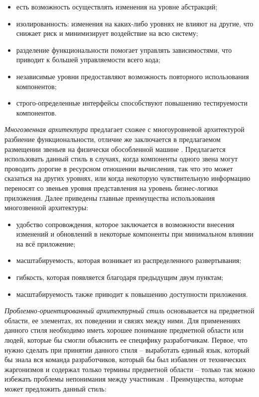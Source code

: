 \begin{itemize}
	\item есть возможность осуществлять изменения на уровне абстракций;
	\item изолированность: изменения на каких-либо уровнях не влияют на другие, что снижает риск и минимизирует воздействие на всю систему;
	\item разделение функциональности помогает управлять зависимостями, что приводит к большей управляемости всего кода;
	\item независимые уровни предоставляют возможность повторного использования компонентов;
	\item строго-определенные интерфейсы способствуют повышению тестируемости компонентов.
\end{itemize}

\emph{Многозвенная архитектура} предлагает схожее с многоуровневой архитектурой разбиение функциональности, отличие же
заключается в предлагаемом размещении звеньев на физически обособленной машине \cite{architecture_volosevich}.
Предлагается использовать данный стиль в случаях, когда компоненты одного звена могут проводить дорогие в ресурсном
отношении вычисления, так что это может сказаться на других уровнях, или когда некоторую чувствительную информацию
переносят со звеньев уровня представления на уровень бизнес-логики приложения. Далее приведены главные преимущества
использования многозвенной архитектуры:

\begin{itemize}
  \item удобство сопровождения, которое заключается в возможности внесения изменений и обновлений в некоторые компоненты
  при минимальном влиянии на всё приложение;
	\item масштабируемость, которая возникает из распределенного развертывания;
	\item гибкость, которая появляется благодаря предыдущим двум пунктам;
	\item масштабируемость также приводит к повышению доступности приложения.
\end{itemize}

\emph{Проблемно-ориентированный архитектурный стиль} основывается на предметной области, ее элементах, их поведении и
связях между ними. Для применениях данного стиля необходимо иметь хорошее понимание предметной области или людей,
которые бы смогли объяснить ее специфику разработчикам. Первое, что нужно сделать при принятии данного
стиля -- выработать единый язык, который бы знала вся команда разработчиков, который бы был избавлен от технических
жаргонизмов и содержал только термины предметной области -- только так можно избежать проблемы непонимания между
участникам \cite{ddd_quickly}. Преимущества, которые может предложить данный стиль:

